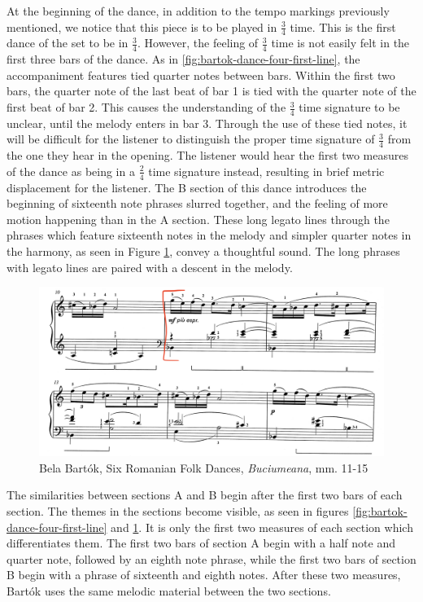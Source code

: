 At the beginning of the dance, in addition to the tempo markings previously mentioned, we notice that this piece is to be played in $\frac{3}{4}$ time. This is the first dance of the set to be in $\frac{3}{4}$. However, the feeling of $\frac{3}{4}$ time is not easily felt in the first three bars of the dance. As in \ref{fig:bartok-dance-four-first-line}\autocite{Lung_2016}, the accompaniment features tied quarter notes between bars. Within the first two bars, the quarter note of the last beat of bar 1 is tied with the quarter note of the first beat of bar 2. This causes the understanding of the $\frac{3}{4}$ time signature to be unclear, until the melody enters in bar 3. Through the use of these tied notes, it will be difficult for the listener to distinguish the proper time signature of $\frac{3}{4}$ from the one they hear in the opening. The listener would hear the first two measures of the dance as being in a $\frac{2}{4}$ time signature instead, resulting in brief metric displacement for the listener. The B section of this dance introduces the beginning of sixteenth note phrases slurred together, and the feeling of more motion happening than in the A section. These long legato lines through the phrases which feature sixteenth notes in the melody and simpler quarter notes in the harmony, as seen in Figure \ref{fig:bartok-dance-four-b-section-two-lines}\autocite{Lung_2016}, convey a thoughtful sound. The long phrases with legato lines are paired with a descent in the melody. 

\begin{figure}[h]
  \centering
  \includegraphics[width=\textwidth]{figures/bartok-dance-four-b-section-two-lines.jpg}
  \caption{Bela Bartók, Six Romanian Folk Dances, \textit{Buciumeana}, mm. 11-15}
  \label{fig:bartok-dance-four-b-section-two-lines}
\end{figure}

The similarities between sections A and B begin after the first two bars of each section. The themes in the sections become visible, as seen in figures \ref{fig:bartok-dance-four-first-line}\autocite{Lung_2016} and \ref{fig:bartok-dance-four-b-section-two-lines}\autocite{Lung_2016}. It is only the first two measures of each section which differentiates them. The first two bars of section A begin with a half note and quarter note, followed by an eighth note phrase, while the first two bars of section B begin with a phrase of sixteenth and eighth notes. After these two measures, Bartók uses the same melodic material between the two sections. 

